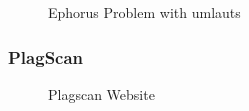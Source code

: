  \begin{figure}[!h]
  \centering
  \caption{Ephorus Problem with umlauts}
  \label{fig:Euphorus_umlauts}
\end{figure}













\newpage
\subsubsection{PlagScan} 

 \begin{figure}[!h]
  \centering
  \caption{Plagscan Website}
  \label{fig:plagawareWebsite}
\end{figure}


